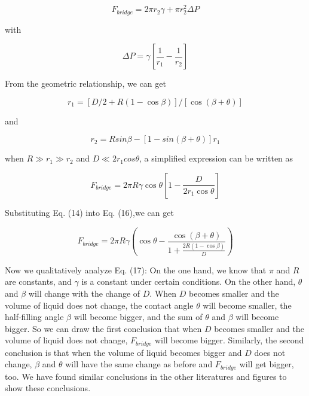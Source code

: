 \documentclass[13pt]{ctexart}
\begin{document}
	\begin{equation}
	F_{bridge} = 2\pi r_{2}\gamma + \pi r^{2}_{2} \Delta P
	\end{equation}
	
	with
	
	\begin{equation}
	\Delta P = \gamma [\frac{1}{r_{1}}-\frac{1}{r_{2}}]
	\end{equation}
	
	From the geometric relationship\cite{MuAnalysis}, we can get
	
	\begin{equation}
	r_{1} = [D/2 + R(1-\cos\beta)]/[\cos(\beta + \theta)]
	\end{equation}
	
	and
	
	\begin{equation}
	r_{2} = Rsin\beta - [1- sin(\beta + \theta)]r_{1}
	\end{equation}
	
	when $ R \gg r_{1} \gg r_{2} $ and $D \ll 2r_{1}cos\theta$, a simplified expression can be written as
	
	\begin{equation}
	F_{bridge} = 2\pi R \gamma \cos\theta [1-\frac{D}{2r_{1}\cos\theta}]
	\end{equation}
	
	Substituting Eq. (14) into Eq. (16),we can get
	
	\begin{equation}
	F_{bridge} = 2\pi R\gamma (\cos\theta - \frac{\cos(\beta + \theta)}{1+\frac{2R(1-\cos\beta)}{D}})
	\end{equation}
	
	Now we qualitatively analyze Eq. (17): On the one hand, we know that $\pi$ and $R$ are constants, and $\gamma$ is a constant under certain conditions. On the other hand, $\theta$ and $\beta$ will change with the change of $D$. When $D$  becomes smaller and the volume of liquid does not change, the contact angle $\theta$ will become smaller, the half-filling angle $\beta$ will become bigger, and the sum of $\theta$ and $\beta$ will become bigger.
	So we can draw the first conclusion that when $D$ becomes smaller and the volume of liquid does not change, $F_{bridge}$ will become bigger. Similarly, the second conclusion is that when the volume of liquid becomes bigger and $D$ does not change, $\beta$ and $\theta$ will have the same change as before and $F_{bridge}$ will get bigger, too.
	We have found similar conclusions in the other literatures and figures to show these conclusions\cite{MuAnalysis}.
	
\end{document}
